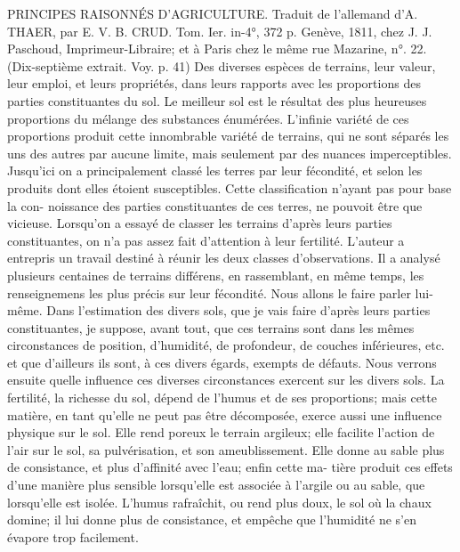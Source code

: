 \setcounter{page}{97} PRINCIPES RAISONNÉS D'AGRICULTURE. Traduit de l'allemand d'A. THAER, par E. V. B. CRUD. Tom. Ier. in-4°, 372 p. Genève, 1811, chez J. J. Paschoud, Imprimeur-Libraire; et à Paris chez le même rue Mazarine, n°. 22. (Dix-septième extrait. Voy. p. 41)
Des diverses espèces de terrains, leur valeur, leur emploi, et leurs propriétés, dans leurs rapports avec les proportions des parties constituantes du sol.
Le meilleur sol est le résultat des plus heureuses proportions du mélange des substances énumérées. L'infinie variété de ces proportions produit cette innombrable variété de terrains, qui ne sont séparés les uns des autres par aucune limite, mais seulement par des nuances imperceptibles.
Jusqu'ici on a principalement classé les terres par leur fécondité, et selon les produits dont elles étoient susceptibles. Cette classification n'ayant pas pour base la con-\setcounter{page}{98} noissance des parties constituantes de ces terres, ne pouvoit être que vicieuse. Lorsqu'on a essayé de classer les terrains d'après leurs parties constituantes, on n'a pas assez fait d'attention à leur fertilité. L'auteur a entrepris un travail destiné à réunir les deux classes d'observations. Il a analysé plusieurs centaines de terrains différens, en rassemblant, en même temps, les renseignemens les plus précis sur leur fécondité. Nous allons le faire parler lui-même.
Dans l'estimation des divers sols, que je vais faire d'après leurs parties constituantes, je suppose, avant tout, que ces terrains sont dans les mêmes circonstances de position, d'humidité, de profondeur, de couches inférieures, etc. et que d'ailleurs ils sont, à ces divers égards, exempts de défauts. Nous verrons ensuite quelle influence ces diverses circonstances exercent sur les divers sols.
La fertilité, la richesse du sol, dépend de l'humus et de ses proportions; mais cette matière, en tant qu'elle ne peut pas être décomposée, exerce aussi une influence physique sur le sol. Elle rend poreux le terrain argileux; elle facilite l'action de l'air sur le sol, sa pulvérisation, et son ameublissement. Elle donne au sable plus de consistance, et plus d'affinité avec l'eau; enfin cette ma-\setcounter{page}{99} tière produit ces effets d'une manière plus sensible lorsqu'elle est associée à l'argile ou au sable, que lorsqu'elle est isolée. L'humus rafraîchit, ou rend plus doux, le sol où la chaux domine; il lui donne plus de consistance, et empêche que l'humidité ne s'en évapore trop facilement.
